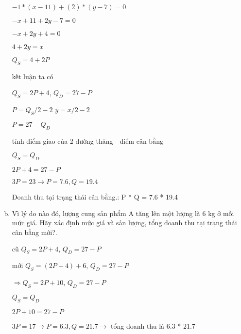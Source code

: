 \begin{enumerate}[(a)]
          $-1 * (x - 11) + (2) * (y - 7) = 0$

          $-x + 11 + 2y - 7 = 0$

          $-x + 2y + 4 = 0$

          $4 + 2y = x$

          $Q_S = 4 + 2P$



          kết luận
          ta có

          $Q_S = 2P + 4$,
          $Q_D = 27 - P$

          $P = Q_S / 2 - 2$ $y = x / 2 - 2$

          $P = 27 - Q_D$

          tính điểm giao của 2 đường thăng - điểm cân bằng

          $Q_S = Q_D$

          $2P + 4 = 27 - P$

          $3P = 23 \rightarrow P = 7.6, Q = 19.4$

          Doanh thu tại trạng thái cân bằng.:
          P * Q = 7.6 * 19.4



    \item Vì lý do nào đó, lượng cung sản phẩm A tăng lên một lượng là 6 kg ở mỗi mức giá. Hãy
          xác định mức giá và sản lượng, tổng doanh thu tại trạng thái cân bằng mới?.

          cũ
          $Q_S = 2P + 4$,
          $Q_D = 27 - P$

          mới
          $Q_S = (2P + 4) + 6$,
          $Q_D = 27 - P$

          $ \Rightarrow Q_S = 2P + 10$,
          $Q_D = 27 - P$

          $Q_S = Q_D$

          $2P + 10 = 27 - P$

          $3P = 17 \rightarrow P = 6.3, Q = 21.7 \rightarrow$ tổng doanh thu là 6.3 * 21.7


\end{enumerate}
